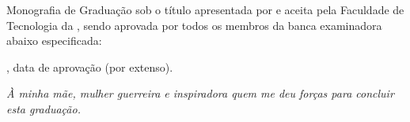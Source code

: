 \documentclass[
	12pt,			%
	openright,		%
	oneside,	
	a4paper,		%
	english,		%
	brazil			%
]{abntex2/abntex2}  %
\begin{document}
\noindent


\frenchspacing

\imprimircapa

\imprimirfolhaderosto*

%
%
% 
%
\begin{folhadeaprovacao}
	\parindent=0pt
	\setlength{\ABNTEXsignskip}{1.5cm}

	Monografia de Graduação sob o título \textit{\imprimirtitulo} apresentada por {\imprimirautor} e aceita pela Faculdade de Tecnologia da {\imprimirinstituicao}, sendo aprovada por todos os membros da banca examinadora abaixo especificada:

	\vspace{1cm}
	\vspace{1cm}
	\vfill
      
	\begin{center}
		\fontsize{12}{15}\selectfont
		\vspace*{0.5cm}
		\imprimirlocal, data de aprovação (por extenso).
		\vspace*{1cm}
	\end{center}
  
\end{folhadeaprovacao}

\begin{dedicatoria}
   \vspace*{\fill}
   \noindent
   \leftskip=7cm
   \textit{À minha mãe, mulher guerreira e inspiradora quem me deu forças para concluir esta graduação.}
   \vspace{5cm}
\end{dedicatoria}
\end{document}
